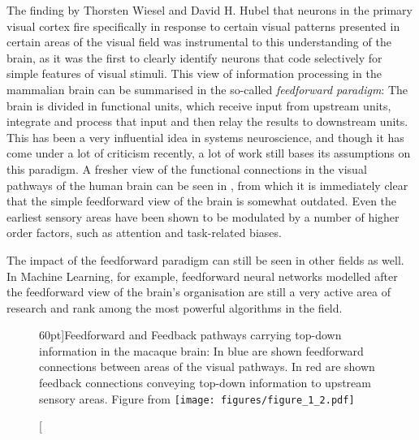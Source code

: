 The finding  by Thorsten Wiesel and David H. Hubel that neurons in the primary visual cortex fire specifically in response to certain visual patterns presented in certain 
areas of the visual field was instrumental to this understanding of the brain, as it was the first to clearly identify neurons that code selectively for simple features of visual 
stimuli.
This view of information processing in the mammalian brain can be summarised in the so-called \emph{feedforward paradigm}: The brain is divided in functional units,
which receive input from upstream units, integrate and process that input and then relay the results to downstream units. This has been a very influential idea in systems
neuroscience, and though it has come under a lot of criticism recently, a lot of work still bases its assumptions on this paradigm. A fresher view of the functional
connections in the visual pathways of the human brain can be seen in , from which it is immediately clear that the simple feedforward view of the 
brain is somewhat outdated. Even the earliest sensory areas have been shown to be modulated by a number of higher order factors, such as attention and task-related 
biases.
\par

The impact of the feedforward paradigm can still be seen in other fields as well. In Machine Learning, for example, feedforward neural networks modelled after the 
feedforward view of the brain's organisation are still a very active area of research and  rank among the most powerful algorithms in the field.\par

\begin{figure}
\caption[Topsdown connections in the primate brain.][60pt]{Feedforward and Feedback pathways carrying top-down information in the macaque brain: In blue are shown feedforward connections between areas of the visual pathways. In red
are shown feedback connections conveying top-down information to upstream sensory areas. Figure from }
\label{fig:feedback_brain}
\texttt{[image: figures/figure\_1\_2.pdf]}
\end{figure}


